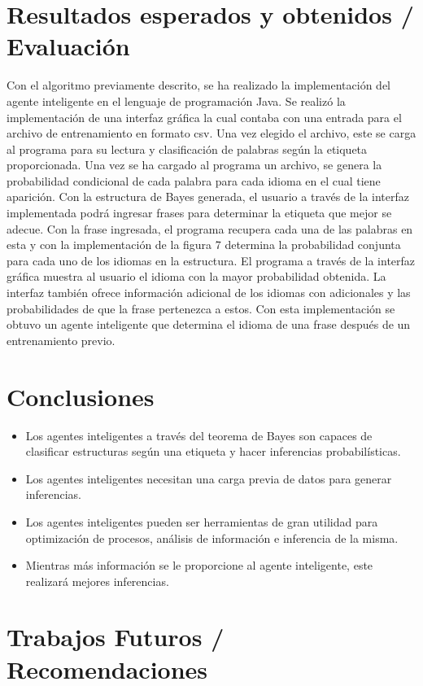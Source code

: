 \documentclass[sigconf]{acmart}
\begin{document}
\section{Resultados esperados y obtenidos / Evaluación}

Con el algoritmo previamente descrito, se ha realizado la implementación del agente inteligente en el lenguaje de programación Java. Se realizó la implementación de una interfaz gráfica la cual contaba con una entrada para el archivo de entrenamiento en formato csv. Una vez elegido el archivo, este se carga al programa para su lectura y clasificación de palabras según la etiqueta proporcionada. Una vez se ha cargado al programa un archivo, se genera la probabilidad condicional de cada palabra para cada idioma en el cual tiene aparición.
Con la estructura de Bayes generada, el usuario a través de la interfaz implementada podrá ingresar frases para determinar la etiqueta que mejor se adecue. Con la frase ingresada, el programa recupera cada una de las palabras en esta y con la implementación de la figura 7 determina la probabilidad conjunta para cada uno de los idiomas en la estructura. El programa a través de la interfaz gráfica muestra al usuario el idioma con la mayor probabilidad obtenida. La interfaz también ofrece información adicional de los idiomas con adicionales y las probabilidades de que la frase pertenezca a estos.
Con esta implementación se obtuvo un agente inteligente que determina el idioma de una frase después de un entrenamiento previo. 


\section{Conclusiones}
\begin{itemize}
\item Los agentes inteligentes a través del teorema de Bayes son capaces de clasificar estructuras según una etiqueta y hacer inferencias probabilísticas.
\item Los agentes inteligentes necesitan una carga previa de datos para generar inferencias.
\item Los agentes inteligentes pueden ser herramientas de gran utilidad para optimización de procesos, análisis de información e inferencia de la misma.
\item Mientras más información se le proporcione al agente inteligente, este realizará mejores inferencias. 
\end{itemize}


\section{Trabajos Futuros / Recomendaciones}
\end{document}
